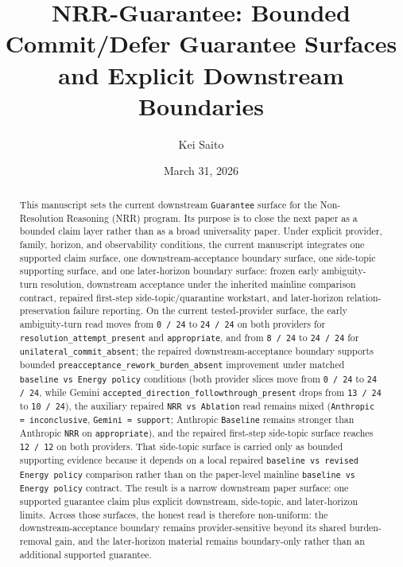 \documentclass[11pt]{article}
\title{NRR-Guarantee: Bounded Commit/Defer Guarantee Surfaces and Explicit Downstream Boundaries}
\author{Kei Saito}
\date{March 31, 2026}
\begin{document}
\maketitle

\begin{abstract}
This manuscript sets the current downstream \texttt{Guarantee} surface for the
Non-Resolution Reasoning (NRR) program. Its purpose is to close the next paper
as a bounded claim layer rather than as a broad universality paper. Under
explicit provider, family, horizon, and observability conditions, the current
manuscript integrates one supported claim surface, one downstream-acceptance
boundary surface, one side-topic supporting surface, and one later-horizon
boundary surface: frozen early ambiguity-turn resolution, downstream
acceptance under the inherited mainline comparison contract, repaired
first-step side-topic/quarantine workstart, and later-horizon
relation-preservation failure reporting. On the current tested-provider
surface, the early ambiguity-turn read moves from \texttt{0 / 24} to
\texttt{24 / 24} on both providers for
\texttt{resolution\_attempt\_present} and \texttt{appropriate}, and from
\texttt{8 / 24} to \texttt{24 / 24} for
\texttt{unilateral\_commit\_absent}; the repaired downstream-acceptance boundary supports bounded
\texttt{preacceptance\_rework\_burden\_absent} improvement under matched
\texttt{baseline vs Energy policy} conditions (both provider slices move from
\texttt{0 / 24} to \texttt{24 / 24}, while Gemini
\texttt{accepted\_direction\_followthrough\_present} drops from
\texttt{13 / 24} to \texttt{10 / 24}), the auxiliary repaired
\texttt{NRR vs Ablation} read remains mixed
(\texttt{Anthropic = inconclusive}, \texttt{Gemini = support}; Anthropic
\texttt{Baseline} remains stronger than Anthropic \texttt{NRR} on
\texttt{appropriate}), and the
repaired first-step side-topic surface reaches \texttt{12 / 12} on both
providers. That side-topic surface is carried only as bounded supporting
evidence because it depends on a local repaired
\texttt{baseline vs revised Energy policy} comparison rather than on the
paper-level mainline \texttt{baseline vs Energy policy} contract. The result is
a narrow downstream paper surface: one supported guarantee claim plus explicit
downstream, side-topic, and later-horizon limits. Across those surfaces, the
honest read is therefore non-uniform: the
downstream-acceptance boundary remains provider-sensitive beyond its shared
burden-removal gain, and the later-horizon material remains boundary-only
rather than an additional supported guarantee.
\end{abstract}
\end{document}
